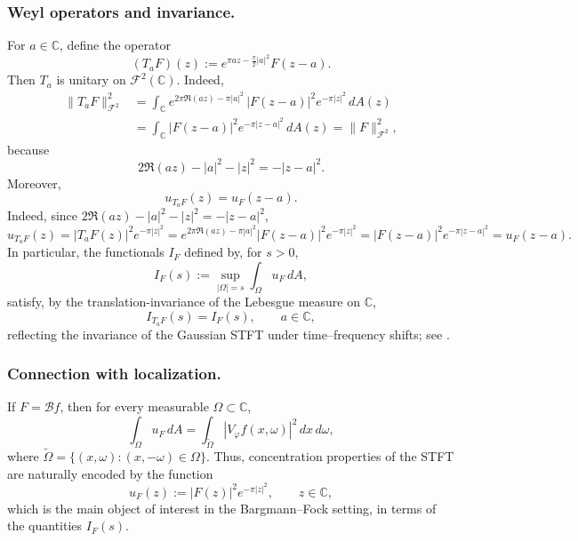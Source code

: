 \documentclass[a4paper,11pt,reqno]{amsart}
\numberwithin{equation}{section}
\theoremstyle{plain} %
\theoremstyle{definition} %
\theoremstyle{remark}
\newcommand{\C}{\mathbb{C}}
\begin{document}
\subsubsection*{Weyl operators and invariance.}
For $a \in \mathbb{C}$, define the operator
\begin{equation}\label{eq:Ta}
(T_a F)(z) := e^{\pi a z - \frac{\pi}{2}|a|^2} F(z - a).
\end{equation}
Then $T_a$ is unitary on $\mathcal{F}^2(\mathbb{C})$. Indeed,
\begin{align*}
\|T_aF\|_{\mathcal F^2}^2
&=
\int_{\C} e^{2\pi \Re(az)-\pi |a|^2}\,|F(z-a)|^2 e^{-\pi |z|^2}\,dA(z) \\
&=
\int_{\C} |F(z-a)|^2 e^{-\pi |z-a|^2}\,dA(z)
=
\|F\|_{\mathcal F^2}^2,
\end{align*}
because
\[
2\Re(az)-|a|^2-|z|^2=-|z-a|^2.
\]
Moreover,
\begin{equation}\label{eq:uF-translate}
u_{T_a F}(z) = u_F(z - a).
\end{equation}
Indeed, since
\(2\Re(az)-|a|^2-|z|^2 = -|z-a|^2\),
\begin{equation}\label{eq:u-translation-global}
u_{T_aF}(z)
=
|T_aF(z)|^2e^{-\pi |z|^2}
=
e^{2\pi\Re(az)-\pi|a|^2}|F(z-a)|^2e^{-\pi |z|^2}
=
|F(z-a)|^2e^{-\pi |z-a|^2}=u_F(z-a).
\end{equation}
In particular, the functionals $I_F$ defined by,
for \(s>0\),
\[
I_F(s):=\sup_{|\Omega|=s}\int_\Omega u_F\,dA,
\]
satisfy, by the translation-invariance of the Lebesgue measure on \(\C\),
\begin{equation}\label{eq:I-translation-global}
I_{T_a F}(s) = I_F(s), \qquad a \in \mathbb{C},
\end{equation}
reflecting the invariance of the Gaussian STFT under time--frequency shifts;
see \cite{Daubechies,Grochenig,Kulikov-Oliveira-Ramos,Goncalves-Oliveira-Steinerberger}.

\medskip

\noindent
\subsubsection*{Connection with localization.}
If $F = \mathcal{B}f$, then for every measurable $\Omega \subset \mathbb{C}$,
\[
\int_\Omega u_F \, dA
= \int_{\widetilde{\Omega}} |V_\varphi f(x,\omega)|^2 \, dx\, d\omega,
\]
where $\widetilde{\Omega} = \{(x,\omega) : (x,-\omega) \in \Omega\}$.
Thus, concentration properties of the STFT are naturally encoded by the function
\begin{equation}\label{eq:uF}
u_F(z) := |F(z)|^2 e^{-\pi |z|^2}, \qquad z \in \mathbb{C},
\end{equation}
which is the main object of interest in the Bargmann--Fock setting, in terms of the
quantities $I_F(s)$.
\end{document}
